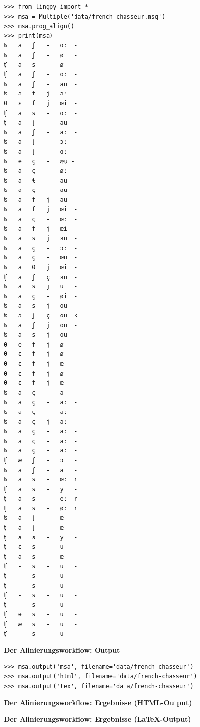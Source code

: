 \begin{verbatim}
>>> from lingpy import *
>>> msa = Multiple('data/french-chasseur.msq')
>>> msa.prog_align()
>>> print(msa)
ʦ   a   ʃ   -   ɑː  -
ʦ   a   ʃ   -   ø   -
ʧ   a   s   -   ø   -
ʧ   a   ʃ   -   oː  -
ʦ   a   ʃ   -   au  -
ʦ   a   f   j   aː  -
θ   ɛ   f   j   œi  -
ʧ   a   s   -   ɑː  -
ʧ   a   ʃ   -   au  -
ʦ   a   ʃ   -   aː  -
ʦ   a   ʃ   -   ɔː  -
ʦ   a   ʃ   -   ɑː  -
ʦ   e   ç   -   æ͜u -
ʦ   a   ç   -   øː  -
ʦ   a   ɬ   -   au  -
ʦ   a   ç   -   au  -
ʦ   a   f   j   au  -
ʦ   a   f   j   œi  -
ʦ   a   ç   -   œː  -
ʦ   a   f   j   œi  -
ʦ   a   s   j   ɜu  -
ʦ   a   ç   -   ɔː  -
ʦ   a   ç   -   œu  -
ʦ   a   θ   j   œi  -
ʧ   a   ʃ   ç   ɜu  -
ʦ   a   s   j   u   -
ʦ   a   ç   -   øi  -
ʦ   a   s   j   ou  -
ʦ   a   ʃ   ç   ou  k
ʦ   a   ʃ   j   ou  -
ʦ   a   s   j   ou  -
θ   e   f   j   ø   -
θ   ɛ   f   j   ø   -
θ   ɛ   f   j   œ   -
θ   ɛ   f   j   ø   -
θ   ɛ   f   j   œ   -
ʦ   a   ç   -   a   -
ʦ   a   ç   -   aː  -
ʦ   a   ç   -   aː  -
ʦ   a   ç   j   aː  -
ʦ   a   ç   -   aː  -
ʦ   a   ç   -   aː  -
ʦ   a   ç   -   aː  -
ʧ   æ   ʃ   -   ɔ   -
ʦ   a   ʃ   -   a   -
ʦ   a   s   -   œː  r
ʧ   a   s   -   y   -
ʧ   a   s   -   eː  r
ʧ   a   s   -   øː  r
ʦ   a   ʃ   -   œ   -
ʧ   a   ʃ   -   œ   -
ʧ   a   s   -   y   -
ʧ   ɛ   s   -   u   -
ʧ   a   s   -   œ   -
ʧ   -   s   -   u   -
ʧ   -   s   -   u   -
ʧ   -   s   -   u   -
ʧ   -   s   -   u   -
ʧ   -   s   -   u   -
ʧ   ə   s   -   u   -
ʧ   æ   s   -   u   -
ʧ   -   s   -   u   -
\end{verbatim}


\vspace{0.5cm}\par\noindent\textbf{Der Alinierungsworkflow: Output}\vspace{0.5cm}

\begin{verbatim}
>>> msa.output('msa', filename='data/french-chasseur')
>>> msa.output('html', filename='data/french-chasseur')
>>> msa.output('tex', filename='data/french-chasseur')
\end{verbatim}



\vspace{0.5cm}\par\noindent\textbf{Der Alinierungsworkflow: Ergebnisse (HTML-Output)}\vspace{0.5cm}


\vspace{0.5cm}\par\noindent\textbf{Der Alinierungsworkflow: Ergebnisse (LaTeX-Output)}\vspace{0.5cm}

